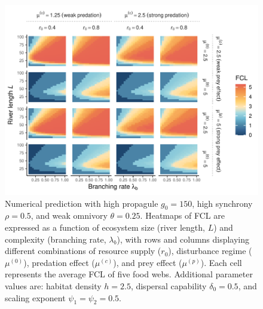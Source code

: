 \begin{figure}
\centering
\includegraphics{../data_fmt/fig_rho05_g150_theta025.pdf}
\caption{Numerical prediction with high propagule \(g_0 = 150\), high
synchrony \(\rho = 0.5\), and weak omnivory \(\theta = 0.25\). Heatmaps
of FCL are expressed as a function of ecosystem size (river length,
\(L\)) and complexity (branching rate, \(\lambda_b\)), with rows and
columns displaying different combinations of resource supply (\(r_0\)),
disturbance regime (\(\mu^{(0)}\)), predation effect (\(\mu^{(c)}\)),
and prey effect (\(\mu^{(p)}\)). Each cell represents the average FCL of
five food webs. Additional parameter values are: habitat density
\(h=2.5\), dispersal capability \(\delta_0=0.5\), and scaling exponent
\(\psi_1=\psi_2=0.5\).}
\end{figure}

\newpage

